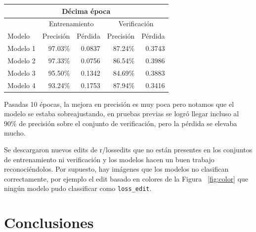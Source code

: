 \documentclass[spanish,11pt,letterpaper]{article}
\begin{document}
\begin{center}
\begin{tabular}{|l||r|r|r|r|}
\hline
\multicolumn{5}{|c|}{Décima época}
\\ \hline
& \multicolumn{2}{|c|}{Entrenamiento} & \multicolumn{2}{|c|}{Verificación}
\\ \hline
Modelo & Precisión & Pérdida & Precisión & Pérdida
\\ \hline
Modelo 1 & 97.03\% & 0.0837 & 87.24\% & 0.3743\\
Modelo 2 & 97.33\% & 0.0756 & 86.54\% & 0.3986\\
Modelo 3 & 95.50\% & 0.1342 & 84.69\% & 0.3883\\
Modelo 4 & 93.24\% & 0.1753 & 87.94\% & 0.3416\\
\hline
\end{tabular}
\end{center}

Pasadas 10 épocas, la mejora en precisión es muy poca pero notamos que el modelo
se estaba sobreajustando, en pruebas previas se logró
llegar incluso al 90\% de precisión sobre el conjunto de verificación, pero la
pérdida se elevaba mucho.

Se descargaron nuevos edits de \textsf{r/lossedits} que no están presentes en
los conjuntos de entrenamiento ni verificación y los modelos hacen un buen trabajo
reconociéndolos. Por supuesto, hay imágenes que los modelos no clasifican
correctamente, por ejemplo el edit basado en colores de la Figura ~\ref{fig:color}
que ningún modelo pudo classificar como \texttt{loss\_edit}.

\section{Conclusiones}
\end{document}
